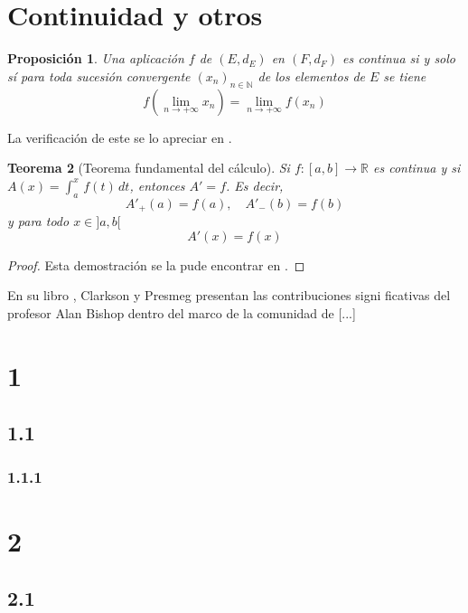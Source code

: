 \documentclass[11pt]{article}
\theoremstyle{plain}%
\newtheorem{thm}{Teorema}[section]
\newtheorem{prop}[thm]{Proposición}
\theoremstyle{definition}%
\begin{document}
\newpage
\section{Continuidad y otros}

\begin{prop}
	Una aplicación \(f\) de \((E, d_E)\) en \((F,d_F)\) es continua si y solo sí para toda sucesión convergente \((x_n)_{n\in\mathbb{N}}\) de los elementos de \(E\) se tiene
	\[
		f \left(\lim_{n \to +\infty} x_n \right) = \lim_{n \to +\infty} f(x_n)
	\]
\end{prop}
La verificación de este se lo apreciar en \cite{EK1989}. %

\begin{thm}[Teorema fundamental del cálculo]
	Si \(f:[a,b]\longrightarrow \mathbb{R}\) es continua y si \(A(x)=\int_a^x\,f(t)\,dt\), entonces \(A'=f\). Es decir,
	\[
		A'_{+}(a)=f(a),\quad A'_{-}(b)=f(b)
	\]
	y para todo \(x \in ]a,b[\)
	\[
		A'(x)=f(x)
	\]
\end{thm}
\begin{proof}
 Esta demostración se la pude encontrar en \cite[pp.\,42--43]{GR2010}. %
\end{proof}
En su libro , Clarkson y Presmeg \cite{9781441935113} presentan las contribuciones signi
ficativas del profesor Alan Bishop dentro del marco de la comunidad de [...]

\section{1}

\subsection{1.1}

\subsubsection{1.1.1}

\section{2}

\subsection{2.1}
\end{document}

